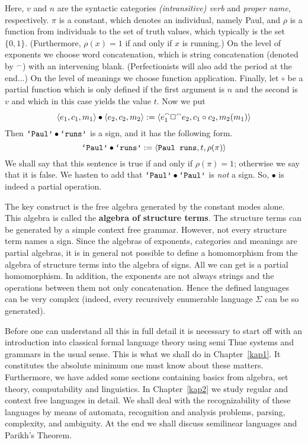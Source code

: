 Here, $v$ and $n$ are the syntactic categories {\it (intransitive)
verb\/} and {\it proper name}, respectively. $\pi$ is a constant,
which denotes an individual, namely Paul, and $\rho$ is a  function
from individuals to the set of truth values, which typically is 
the set $\{0,1\}$. (Furthermore, $\rho(x) = 1$ if and only if $x$ 
is running.) On the level of exponents we choose word concatenation,
which is string concatenation (denoted by $^{\smallfrown}$) with an 
intervening blank. (Perfectionists will also add the period at the 
end...) On the level of meanings we choose function application.
Finally, let $\circ$ be a partial function which is only defined if 
the first argument is $n$ and the second is $v$ and which in this 
case yields the value $t$. Now we put
$$\langle e_1, c_1, m_1\rangle \bullet
    \langle e_2, c_2, m_2\rangle :=
\langle e_1^{\smallfrown}\Box^{\smallfrown}e_2, c_1 \circ c_2,
m_2(m_1)\rangle$$
Then $\mbox{\tt `Paul'} \bullet \mbox{\tt `runs'}$
is a sign, and it has the following form.
$$\mbox{\tt `Paul'} \bullet \mbox{\tt `runs'} :=
\langle \mbox{\tt Paul runs}, t, \rho(\pi)\rangle$$
We shall say that this sentence is true if and only if 
$\rho(\pi) = 1$; otherwise we say that it is false. We hasten 
to add that $\mbox{\tt `Paul'} \bullet \mbox{\tt `Paul'}$ is 
{\it not\/} a sign. So, $\bullet$ is indeed a partial operation.

The key construct is the free algebra generated by the constant
modes alone. This algebra
is called the \textbf{algebra of structure terms}. The structure
terms can be generated by a simple context free grammar. However,
not every structure term names a sign. Since the algebras of
exponents, categories and meanings are partial algebras, it is in
general not possible to define a homomorphism from the algebra of
structure terms into the algebra of signs. All we can get is a
partial homomorphism. In addition, the exponents are not always
strings and the operations between them not only concatenation.
Hence the defined languages can be very complex (indeed, every
recursively enumerable language $\Sigma$ can be so generated).

Before one can understand all this in full detail it is
necessary to start off with an introduction into classical
formal language theory using semi Thue systems and grammars
in the usual sense. This is what we shall do in Chapter~\ref{kap1}. 
It constitutes the absolute minimum one must know about these 
matters. Furthermore, we have
added some sections containing basics from algebra, set theory,
computability and linguistics. In Chapter~\ref{kap2} we study
regular and context free languages in detail. We shall deal
with the recognizability of these languages by means of automata,
recognition and analysis problems, parsing, complexity, and
ambiguity. At the end we shall discuss semilinear languages and 
Parikh's Theorem.

